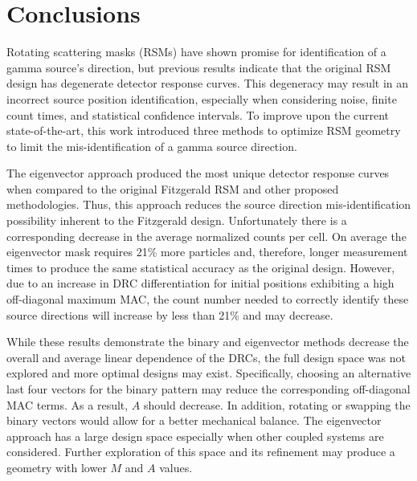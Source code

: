 \documentclass[3p,times]{elsarticle}
\begin{document}
\section{Conclusions}
Rotating scattering masks (RSMs) have shown promise for identification of a gamma source's direction, but previous results indicate that the original RSM design has degenerate detector response curves.  
This degeneracy may result in an incorrect source position identification, especially when considering noise, finite count times, and statistical confidence intervals.
To improve upon the current state-of-the-art, this work introduced three methods to optimize RSM geometry to limit the mis-identification of a gamma source direction.  

The eigenvector approach produced the most unique detector response curves when compared to the original Fitzgerald RSM and other proposed methodologies. 
Thus, this approach reduces the source direction mis-identification possibility inherent to the Fitzgerald design.
Unfortunately there is a corresponding decrease in the average normalized counts per cell.
On average the eigenvector mask requires 21\% more particles and, therefore, longer measurement times to produce the same statistical accuracy as the original design.
However, due to an increase in DRC differentiation for initial positions exhibiting a high off-diagonal maximum MAC, the count number needed to correctly identify these source directions will increase by less than 21\% and may decrease. 

While these results demonstrate the binary and eigenvector methods decrease the overall and average linear dependence of the DRCs, the full design space was not explored and more optimal designs may exist.  
Specifically, choosing an alternative last four vectors for the binary pattern may reduce the corresponding off-diagonal MAC terms.  
As a result, $A$ should decrease.  
In addition, rotating or swapping the binary vectors would allow for a better mechanical balance.  
The eigenvector approach has a large design space especially when other coupled systems are considered.  
Further exploration of this space and its refinement may produce a geometry with lower $M$ and $A$ values.
\end{document}
